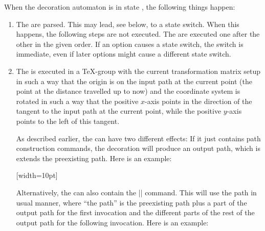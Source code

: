 \begin{command}{\pgfdeclaredecoration{}}
\begin{command}{\state{}}
    When the decoration automaton is in state , the following things
    happen:
    \begin{enumerate}
    \item
      The  are parsed. This may lead, see below, to a 
      state switch. When this happens, the following steps are not
      executed. The  are executed one after the other in
      the given order. If an option causes a state switch, the switch
      is immediate, even if later options might cause a different
      state switch.
    \item
      The  is executed in a \TeX-group with the current
      transformation matrix setup in such a way that the origin is on
      the input path at the current point (the point at the distance
      travelled up to now) and the coordinate system is rotated in
      such a way that the positive $x$-axis points in the direction of
      the tangent to the input path at the current point, while the
      positive $y$-axis points to the left of this tangent.
      
      As described earlier, the  can have two different
      effects: If it just contains path construction commands, the
      decoration will produce an output path, which is extends the
      preexisting path. Here is an example:

\begin{codeexample}[]
{
  [width=10pt]
  {
    \pgfpathlineto{\pgfpoint{0pt}{5pt}}
    \pgfpathlineto{\pgfpoint{5pt}{5pt}}
    \pgfpathlineto{\pgfpoint{5pt}{-5pt}}
    \pgfpathlineto{\pgfpoint{10pt}{-5pt}}
    \pgfpathlineto{\pgfpoint{10pt}{0pt}}
  }
  {
    \pgfpathlineto{\pgfpointdecoratedpathlast}
  }
}
\end{codeexample}

    Alternatively, the  can also contain the
    |\pgfusepath| command. This will use the path in usual manner,
    where ``the path'' is the preexisting path plus a part of the
    output path for the first invocation and the different parts of
    the rest of the output path for the following invocation. Here is
    an example:
            

\end{enumerate}
\end{command}
\end{command}
